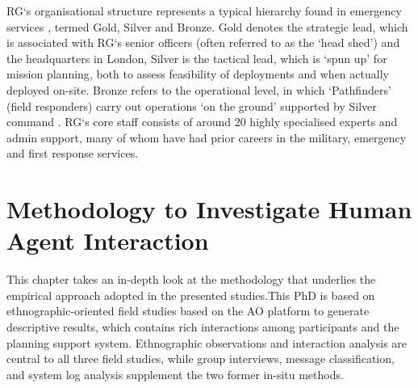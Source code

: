 \ac{RG}`s organisational structure represents a typical hierarchy found in emergency services \cite{U.S.DepartmentofHomelandSecurity2008}, termed Gold, Silver and Bronze. Gold denotes the strategic lead, which is associated with \ac{RG}`s senior officers (often referred to as the `head shed') and the headquarters in London, Silver is the tactical lead, which is `spun up' for mission planning, both to assess feasibility of deployments and when actually deployed on-site. Bronze refers to the operational level, in which `Pathfinders' (field responders) carry out operations `on the ground' supported by Silver command \cite{RescueGlobal2012}. \ac{RG}`s core staff consists of around 20 highly specialised experts and admin support, many of whom have had prior careers in the military, emergency and first response services.\\






\chapter{Methodology to Investigate Human Agent Interaction}\label{ch:methodology}
This chapter takes an in-depth look at the methodology that underlies the empirical approach adopted in the presented studies.This PhD is based on ethnographic-oriented field studies based on the \acf{AO} platform to generate descriptive results, which contains rich interactions among participants and the planning support system. Ethnographic observations and interaction analysis are central to all three field studies, while group interviews, message classification, and system log analysis supplement the two former in-situ methods.\\

